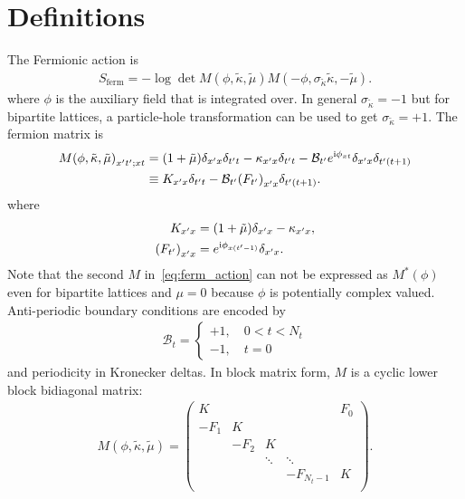 \documentclass[a4paper, fleqn, twoside, notitlepage]{scrartcl}
\begin{document}
\maketitle
\tableofcontents
\clearpage

\section{Definitions}

The Fermionic action is
\begin{align}
  S_\text{ferm} = - \log \det M(\phi, \tilde{\kappa}, \tilde{\mu}) M(-\phi, \sigma_{\tilde{\kappa}}\tilde{\kappa}, -\tilde{\mu}).\label{eq:ferm_action}
\end{align}
where $\phi$ is the auxiliary field that is integrated over. In general $\sigma_{\tilde{\kappa}} = -1$ but for bipartite lattices, a particle-hole transformation can be used to get $\sigma_{\tilde{\kappa}} = +1$. The fermion matrix is
\begin{align}
  {M(\phi, \tilde{\kappa}, \tilde{\mu})}_{x't';xt}
  &= (1+\tilde{\mu})\delta_{x'x}\delta_{t't} - \kappa_{x'x}\delta_{t't} - \mathcal{B}_{t'} e^{\mathrm{i}\phi_{xt}}\delta_{x'x}\delta_{t'(t+1)}\\
  &\equiv K_{x'x}\delta_{t't} - \mathcal{B}_{t'}{(F_{t'})}_{x'x}\delta_{t'(t+1)}.
\end{align}
where
\begin{align}
  K_{x'x} &= (1+\tilde{\mu})\delta_{x'x} - \kappa_{x'x},\\
  {(F_{t'})}_{x'x} &= e^{\mathrm{i}\phi_{x(t'-1)}}\delta_{x'x}.
\end{align}
Note that the second $M$ in~\eqref{eq:ferm_action} can not be expressed as $M^*(\phi)$ even for bipartite lattices and $\mu=0$ because $\phi$ is potentially complex valued.
Anti-periodic boundary conditions are encoded by
\begin{align}
  \mathcal{B}_t =
  \begin{cases}
    +1,\quad 0 < t < N_t\\
    -1,\quad t = 0
  \end{cases}
\end{align}
and periodicity in Kronecker deltas.
In block matrix form, $M$ is a cyclic lower block bidiagonal matrix:
\begin{align}
  M(\phi, \tilde{\kappa}, \tilde{\mu}) =
  \begin{pmatrix}
    K    &      &        &        & F_0 \\
    -F_1 & K    &        &        &     \\
         & -F_2 & K      &        &     \\
         &      & \ddots & \ddots &     \\
         &      &        &-F_{N_t-1}&K   \\
  \end{pmatrix}.\label{eq:ferm_mat_block}
\end{align}
\end{document}
